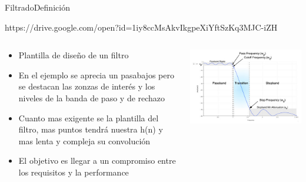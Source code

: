 \begin{frame}[t]{Filtrado}{Definición}

https://drive.google.com/open?id=1iy8ccMsAkvIkgpeXiYftSzKq3MJC-iZH

   \begin{columns}[t]
      \footnotesize
      \begin{column}{.4\textwidth}
         \begin{itemize}
            \item{Plantilla de diseño de un filtro}
            \item{En el ejemplo se aprecia un pasabajos pero se destacan las zonzas de interés y los niveles de la banda de paso y de rechazo}
            \item{Cuanto mas exigente se la plantilla del filtro, mas puntos tendrá nuestra h(n) y mas lenta y compleja su convolución}
            \item{El objetivo es llegar a un compromiso entre los requisitos y la performance }
         \end{itemize}
      \end{column}
      \hspace{2pt}
      \vrule
      \hspace{2pt}
      \begin{column}{.6\textwidth}
         \center\includegraphics[width=1.0\textwidth]{5_clase/pyfda3}
      \end{column}
      \hspace{2pt}
   \end{columns}
   \vfill
\end{frame}
